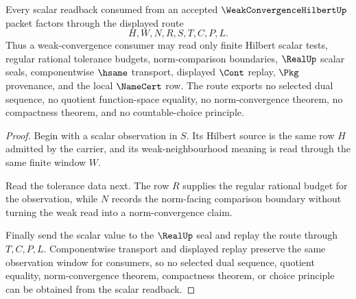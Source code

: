 \begin{theorem}
\label{thm:weak-convergence-hilbert-scalar-readback-route}
Every scalar readback consumed from an accepted $\WeakConvergenceHilbertUp$ packet factors through the displayed route
$$
H,W,N,R,S,T,C,P,L .
$$
Thus a weak-convergence consumer may read only finite Hilbert scalar tests, regular rational tolerance budgets, norm-comparison boundaries, $\RealUp$ scalar seals, componentwise $\hsame$ transport, displayed $\Cont$ replay, $\Pkg$ provenance, and the local $\NameCert$ row. The route exports no selected dual sequence, no quotient function-space equality, no norm-convergence theorem, no compactness theorem, and no countable-choice principle.
\end{theorem}
\begin{proof}
Begin with a scalar observation in $S$. Its Hilbert source is the same row $H$ admitted by the carrier, and its weak-neighbourhood meaning is read through the same finite window $W$.

Read the tolerance data next. The row $R$ supplies the regular rational budget for the observation, while $N$ records the norm-facing comparison boundary without turning the weak read into a norm-convergence claim.

Finally send the scalar value to the $\RealUp$ seal and replay the route through $T,C,P,L$. Componentwise transport and displayed replay preserve the same observation window for consumers, so no selected dual sequence, quotient equality, norm-convergence theorem, compactness theorem, or choice principle can be obtained from the scalar readback.
\end{proof}

